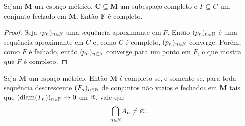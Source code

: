 \begin{prop}
Sejam $\bm M$ um espaço métrico, $\bm C \subseteq \bm M$ um subespaço completo e $F \subseteq C$ um conjunto fechado em $\bm M$. Então $\bm F$ é completo.
\end{prop}
\begin{proof}
Seja $(p_n)_{n \in \mathbb{N}}$ uma sequência aproximante em $F$. Então $(p_n)_{n \in \mathbb{N}}$ é uma sequência aproximante em $C$ e, como $C$ é completo, $(p_n)_{n \in \mathbb{N}}$ converge. Porém, como $F$ é fechado, então $(p_n)_{n \in \mathbb{N}}$ converge para um ponto em $F$, o que mostra que $F$ é completo.
\end{proof}

\begin{teo}
Seja $\bm M$ um espaço métrico. Então $\bm M$ é completo se, e somente se, para toda sequência descrescente $(F_n)_{n \in \mathbb{N}}$ de conjuntos não vazios e fechados em $\bm M$ tais que $(\operatorname{diam}(F_n))_{n \in \mathbb{N}} \rightarrow 0$ em $\mathbb{R}$, vale que
	\begin{equation*}
	\bigcap_{n \in \mathbb{N}} A_n \neq \varnothing.
	\end{equation*}
\end{teo}

